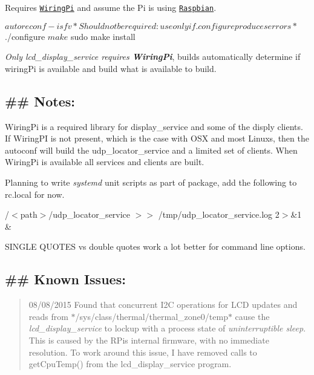 Requires \href{https://projects.drogon.net/raspberry-pi/wiringpi/download-and-install/}{\tt Wiring\+Pi} and assume the Pi is using \href{https://www.raspberrypi.org/downloads/}{\tt Raspbian}. \begin{DoxyVerb}$ autoreconf -isfv            *Should not be required: use only if .configure produces errors*
$ ./configure
$ make
$ sudo make install
\end{DoxyVerb}


{\itshape Only lcd\+\_\+display\+\_\+service requires {\bfseries Wiring\+Pi}}, builds automatically determine if wiring\+Pi is available and build what is available to build.

\subsection*{\#\# Notes\+: }


\begin{DoxyItemize}
\item Wiring\+Pi is a required library for display\+\_\+service and some of the disply clients. If Wiring\+PI is not present, which is the case with O\+SX and most Linuxs, then the autoconf will build the udp\+\_\+locator\+\_\+service and a limited set of clients. When Wiring\+Pi is available all services and clients are built.
\item Planning to write {\itshape systemd} unit scripts as part of package, add the following to rc.\+local for now.
\begin{DoxyItemize}
\item \textquotesingle{}/$<$path$>$/udp\+\_\+locator\+\_\+service $>$$>$ /tmp/udp\+\_\+locator\+\_\+service.log 2$>$\&1 \&\textquotesingle{}
\end{DoxyItemize}
\item S\+I\+N\+G\+LE Q\+U\+O\+T\+ES vs double quotes work a lot better for command line options.
\end{DoxyItemize}

\subsection*{\#\# Known Issues\+: }

\begin{quote}
08/08/2015 Found that concurrent I2C operations for L\+CD updates and reads from $\ast$/sys/class/thermal/thermal\+\_\+zone0/temp$\ast$ cause the {\itshape lcd\+\_\+display\+\_\+service} to lockup with a process state of {\itshape uninterruptible sleep}. This is caused by the R\+Pi\textquotesingle{}s internal firmware, with no immediate resolution. To work around this issue, I have removed calls to get\+Cpu\+Temp() from the lcd\+\_\+display\+\_\+service program.\end{quote}
